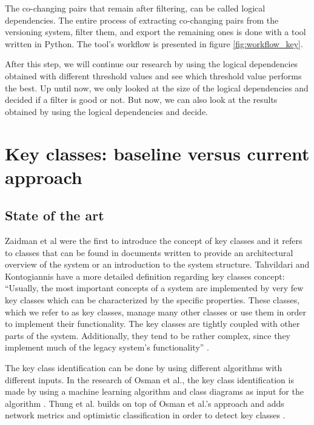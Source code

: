 \documentclass[runningheads]{comsis2}
\begin{document}
The co-changing pairs that remain after filtering, can be called logical dependencies. The entire process of extracting co-changing pairs from the versioning system, filter them, and export the remaining ones is done with a tool written in Python. The tool's workflow is presented in figure \ref{fig:workflow_key}.

After this step, we will continue our research by using the logical dependencies obtained with different threshold values and see which threshold value performs the best. Up until now, we only looked at the size of the logical dependencies and decided if a filter is good or not. But now, we can also look at the results obtained by using the logical dependencies and decide.





\section{Key classes: baseline versus current approach}
\label{sec:baseline_approach}

\subsection{State of the art}

Zaidman et al \cite{ZaidmanJurnal} were the first to introduce the concept of key classes and it refers to classes that can be found in documents written to provide an architectural overview of the system or an introduction to the system structure. 
Tahvildari and Kontogiannis have a more detailed definition regarding key classes concept: “Usually, the most important concepts of a system are implemented by very few key classes which can be characterized by the specific properties. These classes, which we refer to as key classes, manage many other classes or use them in order to implement their functionality. The key classes are tightly coupled with other parts of the system. Additionally, they tend to be rather complex, since they implement much of the legacy system’s functionality” \cite{Tahvildari2004ImprovingDQ}.


The key class identification can be done by using different algorithms with different inputs. In the research of Osman et al., the key class identification is made by using a machine learning algorithm and class diagrams as input for the algorithm \cite{6676885}. Thung et al. builds on top of Osman et al.’s approach and adds network metrics and optimistic classification in order to detect key classes \cite{rocclasification}.  
\end{document}
